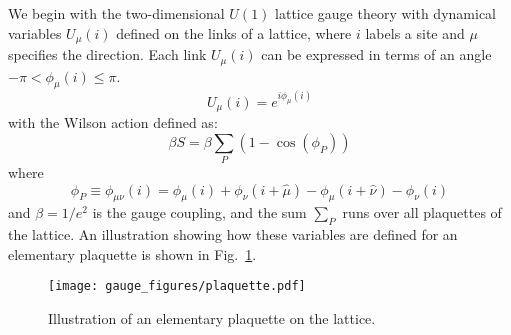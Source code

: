 \documentclass[../main.tex]{subfiles}
\begin{document}
%

We begin with the two-dimensional $U{(1)}$ lattice gauge theory with dynamical variables $U_{\mu}{(i)}$
defined on the links of a lattice, where $i$ labels a site and $\mu$ specifies the direction.
%
%
Each link $U_{\mu}{(i)}$ can be expressed in terms of an angle $-\pi < \phi_{\mu}{(i)} \leq \pi$.
%
\begin{equation}
    U_{\mu}{(i)} = e^{i\phi_{\mu}{(i)}}
    \label{eq:link_variable}
\end{equation}
%
with the Wilson action defined as:
%
\begin{equation}
    \beta S = \beta \sum_{P}{(1 - \cos{(\phi_{P})})}
    \label{eq:wilson_action}
\end{equation}
%
where
%
\begin{equation}
    \phi_{P} \equiv \phi_{\mu\nu}(i) = 
        \phi_{\mu}{(i)} + \phi_{\nu}{(i + \hat{\mu})} 
        - \phi_{\mu}{(i + \hat{\nu})} - \phi_{\nu}{(i)}
    \label{eq:phi_plaquette}
\end{equation}
and $\beta = 1/e^{2}$ is the gauge coupling, and the sum $\sum_{P}$ runs over all plaquettes of the lattice.
%
An illustration showing how these variables are defined for an elementary plaquette is shown in
Fig.~\ref{fig:plaquette}.
%
\begin{figure}[htpb]
  \centering
  \texttt{[image: gauge\_figures/plaquette.pdf]}
  \caption{Illustration of an elementary plaquette on the lattice.}%
\label{fig:plaquette}
\end{figure}
\end{document}

